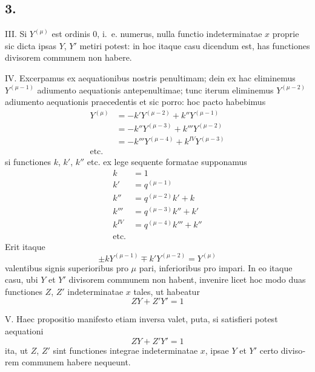\documentclass[12pt,a4paper]{article}
\begin{document}
\begin{otherlanguage}{latin}
\subsection*{3.}
III. Si $Y^{(\mu)}$ est ordinis $0$, i.~e. numerus, nulla functio indeterminatae $x$ proprie sic dicta ipsas $Y$, $Y'$ metiri potest: in hoc itaque casu dicendum est, has functiones divisorem communem non habere.

IV. Excerpamus ex aequationibus nostris penultimam; dein ex hac eliminemus $Y^{(\mu-1)}$ adiumento aequationis antepenultimae; tunc iterum eliminemus $Y^{(\mu-2)}$ adiumento aequationis praecedentis et sic porro: hoc pacto habebimus
\begin{align*}
Y^{(\mu)} &= -k'Y^{(\mu-2)}+k''Y^{(\mu-1)}\\
&= -k''Y^{(\mu-3)}+k'''Y^{(\mu-2)}\\
&= -k'''Y^{(\mu-4)}+k^{IV}Y^{(\mu-3)}\\
\text{etc.}
\end{align*}
si functiones $k$, $k'$, $k''$ etc. ex lege sequente formatae supponamus
\begin{align*}
k &= 1\\
k' &= q^{(\mu-1)}\\
k'' &= q^{(\mu-2)}k'+k\\
k''' &= q^{(\mu-3)}k''+k'\\
k^{IV} &= q^{(\mu-4)}k'''+k''\\
\text{etc.}
\end{align*}
Erit itaque
\[\pm kY^{(\mu-1)}\mp k'Y^{(\mu-2)} = Y^{(\mu)}\]
valentibus signis superioribus pro $\mu$ pari, inferioribus pro impari. In eo itaque casu, ubi $Y$ et $Y'$ divisorem communem non habent, invenire licet hoc modo duas functiones $Z$, $Z'$ indeterminatae $x$ tales, ut habeatur
\[ZY+Z'Y'=1\]

V. Haec propositio manifesto etiam inversa valet, puta, si satisfieri potest aequationi
\[ZY+Z'Y'=1\]
ita, ut $Z$, $Z'$ sint functiones integrae indeterminatae $x$, ipsae $Y$ et $Y'$ certo divisorem communem habere nequeunt.


\end{otherlanguage}
\end{document}
